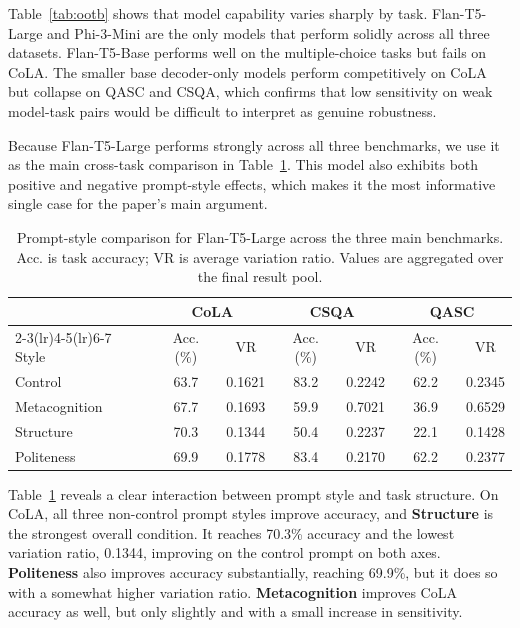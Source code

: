 \documentclass[11pt]{article}
\begin{document}
Table~\ref{tab:ootb} shows that model capability varies sharply by task. Flan-T5-Large and Phi-3-Mini are the only models that perform solidly across all three datasets. Flan-T5-Base performs well on the multiple-choice tasks but fails on CoLA. The smaller base decoder-only models perform competitively on CoLA but collapse on QASC and CSQA, which confirms that low sensitivity on weak model-task pairs would be difficult to interpret as genuine robustness.

Because Flan-T5-Large performs strongly across all three benchmarks, we use it as the main cross-task comparison in Table~\ref{tab:main-results}. This model also exhibits both positive and negative prompt-style effects, which makes it the most informative single case for the paper's main argument.

\begin{table}[t]
\centering
\small
\setlength{\tabcolsep}{5pt}
\begin{tabular}{lcccccc}
\toprule
& \multicolumn{2}{c}{CoLA} & \multicolumn{2}{c}{CSQA} & \multicolumn{2}{c}{QASC} \\
\cmidrule(lr){2-3}\cmidrule(lr){4-5}\cmidrule(lr){6-7}
Style & Acc. (\%) & VR & Acc. (\%) & VR & Acc. (\%) & VR \\
\midrule
Control & 63.7 & 0.1621 & 83.2 & 0.2242 & 62.2 & 0.2345 \\
Metacognition & 67.7 & 0.1693 & 59.9 & 0.7021 & 36.9 & 0.6529 \\
Structure & 70.3 & 0.1344 & 50.4 & 0.2237 & 22.1 & 0.1428 \\
Politeness & 69.9 & 0.1778 & 83.4 & 0.2170 & 62.2 & 0.2377 \\
\bottomrule
\end{tabular}
\caption{Prompt-style comparison for Flan-T5-Large across the three main benchmarks. Acc. is task accuracy; VR is average variation ratio. Values are aggregated over the final result pool.}
\label{tab:main-results}
\end{table}

Table~\ref{tab:main-results} reveals a clear interaction between prompt style and task structure. On CoLA, all three non-control prompt styles improve accuracy, and \textbf{Structure} is the strongest overall condition. It reaches 70.3\% accuracy and the lowest variation ratio, 0.1344, improving on the control prompt on both axes. \textbf{Politeness} also improves accuracy substantially, reaching 69.9\%, but it does so with a somewhat higher variation ratio. \textbf{Metacognition} improves CoLA accuracy as well, but only slightly and with a small increase in sensitivity.
\end{document}
